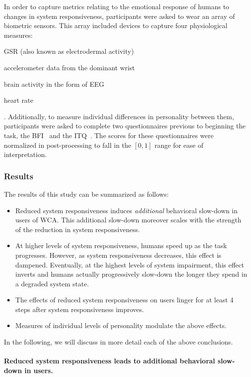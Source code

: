 In order to capture metrics relating to the emotional response of humans to changes in system responsiveness, participants were asked to wear an array of biometric sensors.
This array included devices to capture four physiological measures:
\begin{enumerate*}[itemjoin={{, }}, itemjoin*={{, and }}, label={(\arabic*)}]
    \item \gls{GSR} (also known as electrodermal activity)
    \item accelerometer data from the dominant wrist
    \item brain activity in the form of \gls{EEG}
    \item heart rate
\end{enumerate*}.
Additionally, to measure individual differences in personality between them, participants were asked to complete two questionnaires previous to beginning the task, the \gls{BFI}~\cite{john1999big} and the \gls{ITQ}~\cite{witmer1998measuring}.
The scores for these questionnaires were normalized in post-processing to fall in the \ensuremath{[0, 1]} range for ease of interpretation.

\subsubsection{Results}

The results of this study can be summarized as follows:

\begin{itemize}
    \item Reduced system responsiveness induces \emph{additional} behavioral slow-down in users of \gls{WCA}.
    This additional slow-down moreover scales with the strength of the reduction in system responsiveness.

    \item At higher levels of system responsiveness, humans speed up as the task progresses.
    However, as system responsiveness decreases, this effect is dampened.
    Eventually, at the highest levels of system impairment, this effect inverts and humans actually progressively slow-down the longer they spend in a degraded system state.

    \item The effects of reduced system responsiveness on users linger for at least \num{4} steps after system responsiveness improves.
    \item Measures of individual levels of personality modulate the above effects.
\end{itemize}

In the following, we will discuss in more detail each of the above conclusions.

\paragraph{Reduced system responsiveness leads to additional behavioral slow-down in users.}
